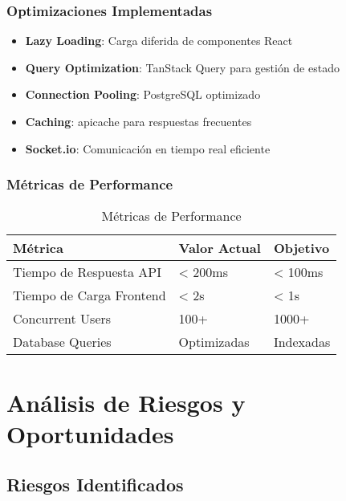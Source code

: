 \documentclass[12pt,a4paper]{article}
\begin{document}
\subsubsection{Optimizaciones Implementadas}
\begin{itemize}
    \item \textbf{Lazy Loading}: Carga diferida de componentes React
    \item \textbf{Query Optimization}: TanStack Query para gestión de estado
    \item \textbf{Connection Pooling}: PostgreSQL optimizado
    \item \textbf{Caching}: apicache para respuestas frecuentes
    \item \textbf{Socket.io}: Comunicación en tiempo real eficiente
\end{itemize}

\subsubsection{Métricas de Performance}
\begin{table}[H]
\centering
\begin{tabular}{|l|l|l|}
\hline
\textbf{Métrica} & \textbf{Valor Actual} & \textbf{Objetivo} \\
\hline
Tiempo de Respuesta API & < 200ms & < 100ms \\
Tiempo de Carga Frontend & < 2s & < 1s \\
Concurrent Users & 100+ & 1000+ \\
Database Queries & Optimizadas & Indexadas \\
\hline
\end{tabular}
\caption{Métricas de Performance}
\end{table}

\section{Análisis de Riesgos y Oportunidades}

\subsection{Riesgos Identificados}
\end{document}
